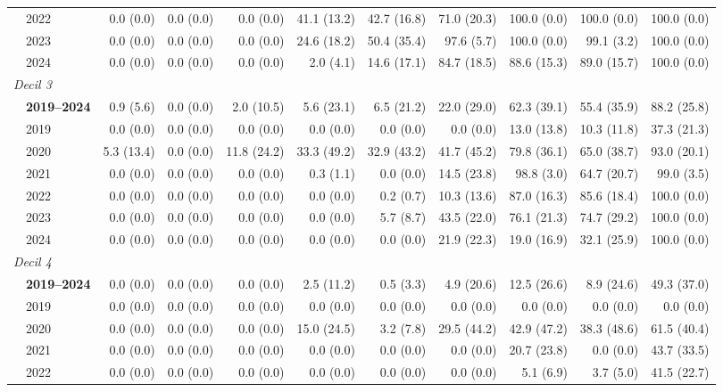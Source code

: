 \begin{table}[htbp]
\begin{tabular}{llrrrrrrrrr}
 & 2022 & 0.0 (0.0) & 0.0 (0.0) & 0.0 (0.0) & 41.1 (13.2) & 42.7 (16.8) & 71.0 (20.3) & 100.0 (0.0) & 100.0 (0.0) & 100.0 (0.0) \\
 & 2023 & 0.0 (0.0) & 0.0 (0.0) & 0.0 (0.0) & 24.6 (18.2) & 50.4 (35.4) & 97.6 (5.7) & 100.0 (0.0) & 99.1 (3.2) & 100.0 (0.0) \\
 & 2024 & 0.0 (0.0) & 0.0 (0.0) & 0.0 (0.0) & 2.0 (4.1) & 14.6 (17.1) & 84.7 (18.5) & 88.6 (15.3) & 89.0 (15.7) & 100.0 (0.0) \\
\midrule
\multicolumn{11}{l}{\textit{Decil 3}} \\
 & \textbf{2019–2024} & 0.9 (5.6) & 0.0 (0.0) & 2.0 (10.5) & 5.6 (23.1) & 6.5 (21.2) & 22.0 (29.0) & 62.3 (39.1) & 55.4 (35.9) & 88.2 (25.8) \\
 & 2019 & 0.0 (0.0) & 0.0 (0.0) & 0.0 (0.0) & 0.0 (0.0) & 0.0 (0.0) & 0.0 (0.0) & 13.0 (13.8) & 10.3 (11.8) & 37.3 (21.3) \\
 & 2020 & 5.3 (13.4) & 0.0 (0.0) & 11.8 (24.2) & 33.3 (49.2) & 32.9 (43.2) & 41.7 (45.2) & 79.8 (36.1) & 65.0 (38.7) & 93.0 (20.1) \\
 & 2021 & 0.0 (0.0) & 0.0 (0.0) & 0.0 (0.0) & 0.3 (1.1) & 0.0 (0.0) & 14.5 (23.8) & 98.8 (3.0) & 64.7 (20.7) & 99.0 (3.5) \\
 & 2022 & 0.0 (0.0) & 0.0 (0.0) & 0.0 (0.0) & 0.0 (0.0) & 0.2 (0.7) & 10.3 (13.6) & 87.0 (16.3) & 85.6 (18.4) & 100.0 (0.0) \\
 & 2023 & 0.0 (0.0) & 0.0 (0.0) & 0.0 (0.0) & 0.0 (0.0) & 5.7 (8.7) & 43.5 (22.0) & 76.1 (21.3) & 74.7 (29.2) & 100.0 (0.0) \\
 & 2024 & 0.0 (0.0) & 0.0 (0.0) & 0.0 (0.0) & 0.0 (0.0) & 0.0 (0.0) & 21.9 (22.3) & 19.0 (16.9) & 32.1 (25.9) & 100.0 (0.0) \\
\midrule
\multicolumn{11}{l}{\textit{Decil 4}} \\
 & \textbf{2019–2024} & 0.0 (0.0) & 0.0 (0.0) & 0.0 (0.0) & 2.5 (11.2) & 0.5 (3.3) & 4.9 (20.6) & 12.5 (26.6) & 8.9 (24.6) & 49.3 (37.0) \\
 & 2019 & 0.0 (0.0) & 0.0 (0.0) & 0.0 (0.0) & 0.0 (0.0) & 0.0 (0.0) & 0.0 (0.0) & 0.0 (0.0) & 0.0 (0.0) & 0.0 (0.0) \\
 & 2020 & 0.0 (0.0) & 0.0 (0.0) & 0.0 (0.0) & 15.0 (24.5) & 3.2 (7.8) & 29.5 (44.2) & 42.9 (47.2) & 38.3 (48.6) & 61.5 (40.4) \\
 & 2021 & 0.0 (0.0) & 0.0 (0.0) & 0.0 (0.0) & 0.0 (0.0) & 0.0 (0.0) & 0.0 (0.0) & 20.7 (23.8) & 0.0 (0.0) & 43.7 (33.5) \\
 & 2022 & 0.0 (0.0) & 0.0 (0.0) & 0.0 (0.0) & 0.0 (0.0) & 0.0 (0.0) & 0.0 (0.0) & 5.1 (6.9) & 3.7 (5.0) & 41.5 (22.7) \\

\end{tabular}
\end{table}
